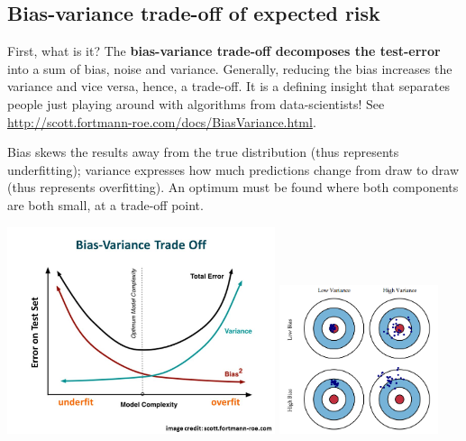 \documentclass{article}
\begin{document}
\subsection{Bias-variance trade-off of expected risk}
First, what is it? The \textbf{bias-variance trade-off decomposes the test-error} into a sum of bias, noise and variance. Generally, reducing the bias increases the variance and vice versa, hence, a trade-off. It is a defining insight that separates people just playing around with algorithms from data-scientists! See \url{http://scott.fortmann-roe.com/docs/BiasVariance.html}.
\begin{testexample}
    Bias skews the results away from the true distribution (thus represents underfitting); variance expresses how much predictions change from draw to draw (thus represents overfitting). An optimum must be found where both components are both small, at a trade-off point.
    \begin{center}
    \includegraphics[width=0.59\textwidth,trim={0cm 2.5cm 0cm 4cm},clip]{Bias-Variance+Trade+Off.jpg}
    \includegraphics[width=0.35\textwidth]{Low-High-Variances-Biases.png}
    \end{center}
\end{testexample}
\end{document}
